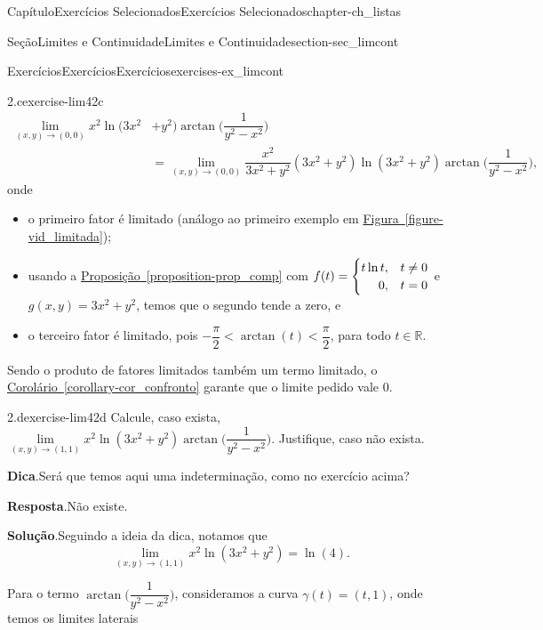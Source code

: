 \documentclass[oneside,10pt,]{book}
\newcommand{\blocktitlefont}{\relax}
\newcommand{\xreffont}{\relax}
\numberwithin{equation}{section}
\newcommand{\R}{\mathbb R}
\begin{document}
\begin{chapterptx}{Capítulo}{Exercícios Selecionados}{}{Exercícios Selecionados}{}{}{chapter-ch_listas}
\begin{sectionptx}{Seção}{Limites e Continuidade}{}{Limites e Continuidade}{}{}{section-sec_limcont}
\begin{exercises-subsection-numberless}{Exercícios}{Exercícios}{}{Exercícios}{}{}{exercises-ex_limcont}
\begin{divisionexercise}{2.c}{}{}{exercise-lim42c}
\begin{align*}
\lim\limits_{(x,y)\to(0,0)}x^2\ln(3x^2&+y^2)\arctan\big(\dfrac{1}{y^2-x^2}\big)\\
&=\lim\limits_{(x,y)\to(0,0)}
\dfrac{x^2}{3x^2+y^2}(3x^2+y^2)\ln(3x^2+y^2)\arctan\big(\dfrac{1}{y^2-x^2}\big),
\end{align*}
onde%
\begin{itemize}[label=\textbullet]
\item{}o primeiro fator é limitado (análogo ao primeiro exemplo em \hyperref[figure-vid_limitada]{Figura~{\xreffont\ref{figure-vid_limitada}}});%
\item{}usando a \hyperref[proposition-prop_comp]{Proposição~{\xreffont\ref{proposition-prop_comp}}} com \(f(t)=\begin{cases}t\ln t,& t\neq 0\\\hfill 0,&
t=0\end{cases}\) e \(g(x,y)=3x^2+y^2\), temos que o segundo tende a zero, e%
\item{}o terceiro fator é limitado, pois \(-\dfrac{\pi}{2}<\arctan(t)<\dfrac{\pi}{2}\), para todo \(t\in\R\).%
\end{itemize}
%
\par
Sendo o produto de fatores limitados também um termo limitado, o \hyperref[corollary-cor_confronto]{Corolário~{\xreffont\ref{corollary-cor_confronto}}} garante que o limite pedido vale \(0\).%
\end{divisionexercise}%
\begin{divisionexercise}{2.d}{}{}{exercise-lim42d}%
Calcule, caso exista, \(\lim\limits_{(x,y)\to(1,1)}
x^2\ln(3x^2+y^2)\arctan\big(\dfrac{1}{y^2-x^2}\big)\). Justifique, caso não exista.%
\par\smallskip%
\noindent\textbf{\blocktitlefont Dica}.\hypertarget{hint-lim42d-b}{}\quad{}Será que temos aqui uma indeterminação, como no exercício acima?%
\par\smallskip%
\noindent\textbf{\blocktitlefont Resposta}.\hypertarget{answer-lim42d-c}{}\quad{}Não existe.%
\par\smallskip%
\noindent\textbf{\blocktitlefont Solução}.\hypertarget{solution-lim42d-d}{}\quad{}Seguindo a ideia da dica, notamos que%
\begin{equation*}
\lim\limits_{(x,y)\to(1,1)}
x^2\ln(3x^2+y^2)=\ln(4).
\end{equation*}
%
\par
Para o termo \(\arctan\big(\dfrac{1}{y^2-x^2}\big)\), consideramos a curva \(\gamma(t)=(t,1)\), onde temos os limites laterais%

\end{divisionexercise}
\end{exercises-subsection-numberless}
\end{sectionptx}
\end{chapterptx}
\end{document}
